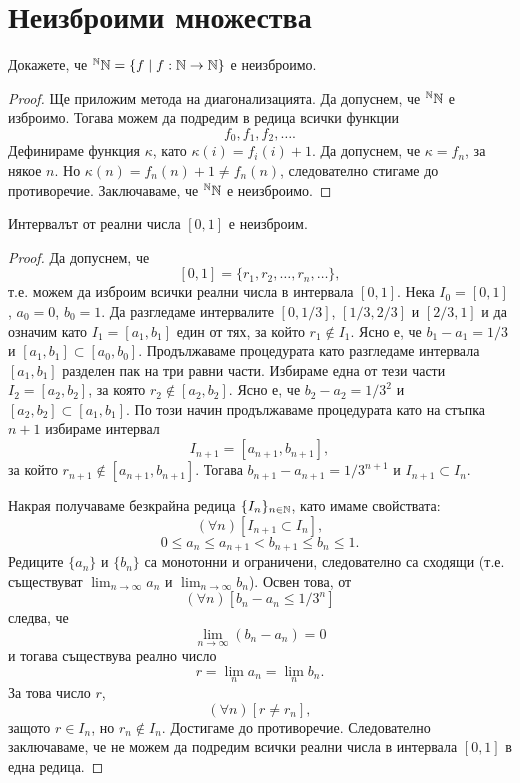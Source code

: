 \section{Неизброими множества}

\begin{problem}
  Докажете, че $^{\mathbb{N}}\mathbb{N} = \{f \mid f:\mathbb{N} \to \mathbb{N}\}$ е неизброимо.
\end{problem}
\begin{proof}
  Ще приложим метода на диагонализацията. 
  Да допуснем, че $^{\mathbb{N}}\mathbb{N}$ е изброимо.
  Тогава можем да подредим в редица всички функции \[f_0,f_1,f_2,\dots.\]
  Дефинираме функция $\kappa$, като $\kappa(i) = f_i(i)+1$.
  Да допуснем, че $\kappa = f_n$, за някое $n$.
  Но $\kappa(n) = f_n(n)+1 \neq f_n(n)$, следователно стигаме до противоречие.
  Заключаваме, че $^{\mathbb{N}}\mathbb{N}$ е неизброимо.
\end{proof}

\begin{thm}[Кантор]
  Интервалът от реални числа $[0,1]$ е неизброим.
\end{thm}
\begin{proof}
  Да допуснем, че
  \[[0,1] = \{r_1,r_2,\dots,r_n,\dots\},\]
  т.е. можем да изброим всички реални числа в интервала $[0,1]$.
  Нека $I_0 = [0, 1]$, $a_0 = 0$, $b_0 = 1$.
  Да разгледаме интервалите $[0,1/3]$, $[1/3,2/3]$ и $[2/3,1]$ 
  и да означим като $I_1 = [a_1,b_1]$ един от тях, за който $r_1 \not\in I_1$.
  Ясно е, че $b_1-a_1 = 1/3$ и $[a_1,b_1] \subset [a_0,b_0]$.
  Продължаваме процедурата като разгледаме интервала $[a_1,b_1]$ разделен пак на три равни части.
  Избираме една от тези части $I_2 = [a_2,b_2]$, за която $r_2 \not\in [a_2,b_2]$.
  Ясно е, че $b_2-a_2 = 1/3^2$ и $[a_2,b_2] \subset [a_1,b_1]$.
  По този начин продължаваме процедурата като на стъпка $n+1$ 
  избираме интервал 
  \[I_{n+1} = [a_{n+1},b_{n+1}],\] за който $r_{n+1} \not\in [a_{n+1},b_{n+1}]$.
  Тогава $b_{n+1}-a_{n+1} = 1/3^{n+1}$ и $I_{n+1} \subset I_n$.

  Накрая получаваме безкрайна редица $\{I_n\}_{n\in\mathbb{N}}$, като имаме свойствата:
  \[(\forall n)[I_{n+1}\subset I_n],\]
  \[0\leq a_n \leq a_{n+1} < b_{n+1} \leq b_n \leq 1.\]
  Редиците $\{a_n\}$ и $\{b_n\}$ са монотонни и ограничени, следователно са сходящи 
  (т.е. съществуват $\lim_{n\to\infty} a_n$ и $\lim_{n\to\infty} b_n$).
  Освен това, от \[(\forall n)[b_n-a_n \leq 1/3^n]\] следва, че 
  \[\lim_{n\to\infty}(b_n-a_n) = 0\] и тогава съществува реално число 
  \[r = \lim_n a_n = \lim_n b_n.\]
  За това число $r$,
  \[(\forall n)[r \neq r_n],\]
  защото $r \in I_n$, но $r_n \not\in I_n$.
  Достигаме до противоречие.
  Следователно заключаваме, че не можем да подредим всички реални числа в интервала $[0,1]$
  в една редица.
\end{proof}

